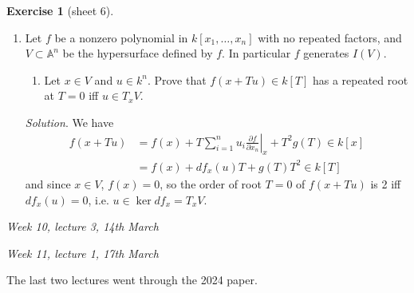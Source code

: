 \documentclass{article}
\newcommand{\A}{\mathbb{A}}
\theoremstyle{definition}
\newtheorem{exe}[defn]{Exercise}
\begin{document}
\begin{exe}[sheet 6]
\begin{enumerate}
\item Let $f$ be a nonzero polynomial in $k[x_1,\ldots,x_n]$ with no repeated factors, and $V\subset\A^n$ be the hypersurface defined by $f$. In particular $f$ generates $I(V)$.
\begin{enumerate}
\item Let $x\in V$ and $u\in k^n$. Prove that $f(x+Tu)\in k[T]$ has a repeated root at $T=0$ iff $u\in T_xV$.
\end{enumerate}

\textit{Solution}. We have
\[
\begin{aligned}
f(x+Tu)&=f(x)+T\sum_{i=1}^n u_i\left.\frac{\partial f}{\partial x_n}\right|_x+T^2 g(T)\in k[x] \\
&=f(x)+df_x(u)T+g(T)T^2\in k[T]
\end{aligned}
\]
and since $x\in V$, $f(x)=0$, so the order of root $T=0$ of $f(x+Tu)$ is 2 iff $df_x(u)=0$, i.e. $u\in\ker df_x=T_xV$.
\end{enumerate}
\end{exe}

\begin{flushright}
\textit{Week 10, lecture 3, 14th March}
\end{flushright}

\begin{flushright}
\textit{Week 11, lecture 1, 17th March}
\end{flushright}

The last two lectures went through the 2024 paper.
\end{document}
